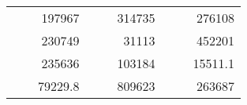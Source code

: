 \begin{table}[H]
\begin{tabular}{|ccrccrccc}
\rowcolor[HTML]{DAE8FC} 
\multicolumn{1}{|c|}{\cellcolor[HTML]{FFFFC7}}                                & \multicolumn{1}{c|}{\cellcolor[HTML]{DAE8FC}}                      & \multicolumn{1}{r|}{\cellcolor[HTML]{DAE8FC}197967}    & \multicolumn{1}{c|}{\cellcolor[HTML]{FFFFC7}}                                & \multicolumn{1}{c|}{\cellcolor[HTML]{DAE8FC}}                       & \multicolumn{1}{r|}{\cellcolor[HTML]{DAE8FC}314735}    & \multicolumn{1}{c|}{\cellcolor[HTML]{FFFFC7}}                                & \multicolumn{1}{c|}{\cellcolor[HTML]{DAE8FC}}                      & \multicolumn{1}{r|}{\cellcolor[HTML]{DAE8FC}276108}    \\ \cline{3-3} \cline{6-6} \cline{9-9} 
\multicolumn{1}{|c|}{\cellcolor[HTML]{FFFFC7}}                                & \multicolumn{1}{c|}{\cellcolor[HTML]{DAE8FC}}                      & \multicolumn{1}{r|}{\cellcolor[HTML]{DDFDFF}230749}    & \multicolumn{1}{c|}{\cellcolor[HTML]{FFFFC7}}                                & \multicolumn{1}{c|}{\cellcolor[HTML]{DAE8FC}}                       & \multicolumn{1}{r|}{\cellcolor[HTML]{DDFDFF}31113}     & \multicolumn{1}{c|}{\cellcolor[HTML]{FFFFC7}}                                & \multicolumn{1}{c|}{\cellcolor[HTML]{DAE8FC}}                      & \multicolumn{1}{r|}{\cellcolor[HTML]{DDFDFF}452201}    \\ \cline{3-3} \cline{6-6} \cline{9-9} 
\rowcolor[HTML]{DAE8FC} 
\multicolumn{1}{|c|}{\cellcolor[HTML]{FFFFC7}}                                & \multicolumn{1}{c|}{\cellcolor[HTML]{DAE8FC}}                      & \multicolumn{1}{r|}{\cellcolor[HTML]{DAE8FC}235636}    & \multicolumn{1}{c|}{\cellcolor[HTML]{FFFFC7}}                                & \multicolumn{1}{c|}{\cellcolor[HTML]{DAE8FC}}                       & \multicolumn{1}{r|}{\cellcolor[HTML]{DAE8FC}103184}    & \multicolumn{1}{c|}{\cellcolor[HTML]{FFFFC7}}                                & \multicolumn{1}{c|}{\cellcolor[HTML]{DAE8FC}}                      & \multicolumn{1}{r|}{\cellcolor[HTML]{DAE8FC}15511.1}   \\ \cline{3-3} \cline{6-6} \cline{9-9} 
\multicolumn{1}{|c|}{\cellcolor[HTML]{FFFFC7}}                                & \multicolumn{1}{c|}{\cellcolor[HTML]{DAE8FC}}                      & \multicolumn{1}{r|}{\cellcolor[HTML]{DDFDFF}79229.8}   & \multicolumn{1}{c|}{\cellcolor[HTML]{FFFFC7}}                                & \multicolumn{1}{c|}{\cellcolor[HTML]{DAE8FC}}                       & \multicolumn{1}{r|}{\cellcolor[HTML]{DDFDFF}809623}    & \multicolumn{1}{c|}{\cellcolor[HTML]{FFFFC7}}                                & \multicolumn{1}{c|}{\cellcolor[HTML]{DAE8FC}}                      & \multicolumn{1}{r|}{\cellcolor[HTML]{DDFDFF}263687}    \\ \cline{3-3} \cline{6-6} \cline{9-9} 

\end{tabular}
\end{table}

